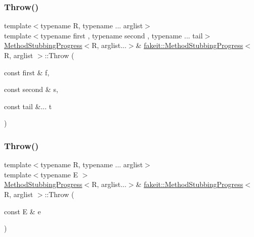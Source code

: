\mbox{\label{structfakeit_1_1MethodStubbingProgress_a516a0ade529c61e4ab6df1bf47f3f1b2}} 
\subsubsection{\texorpdfstring{Throw()}{Throw()}\hspace{0.1cm}{\footnotesize\ttfamily [21/27]}}
{\footnotesize\ttfamily template$<$typename R, typename ... arglist$>$ \\
template$<$typename first , typename second , typename ... tail$>$ \\
\mbox{\hyperlink{structfakeit_1_1MethodStubbingProgress}{Method\+Stubbing\+Progress}}$<$R, arglist...$>$\& \mbox{\hyperlink{structfakeit_1_1MethodStubbingProgress}{fakeit\+::\+Method\+Stubbing\+Progress}}$<$ R, arglist $>$\+::Throw (\begin{DoxyParamCaption}\item[{const first \&}]{f,  }\item[{const second \&}]{s,  }\item[{const tail \&...}]{t }\end{DoxyParamCaption})\hspace{0.3cm}{\ttfamily [inline]}}

\mbox{\label{structfakeit_1_1MethodStubbingProgress_ae3da30d02ba5de4bfa82f51bba5602c3}} 
\subsubsection{\texorpdfstring{Throw()}{Throw()}\hspace{0.1cm}{\footnotesize\ttfamily [22/27]}}
{\footnotesize\ttfamily template$<$typename R, typename ... arglist$>$ \\
template$<$typename E $>$ \\
\mbox{\hyperlink{structfakeit_1_1MethodStubbingProgress}{Method\+Stubbing\+Progress}}$<$R, arglist...$>$\& \mbox{\hyperlink{structfakeit_1_1MethodStubbingProgress}{fakeit\+::\+Method\+Stubbing\+Progress}}$<$ R, arglist $>$\+::Throw (\begin{DoxyParamCaption}\item[{const E \&}]{e }\end{DoxyParamCaption})\hspace{0.3cm}{\ttfamily [inline]}}

